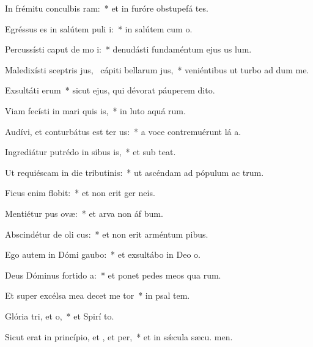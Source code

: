 \item In frémitu conculbis ram:~* et in furóre obstupefá tes.
\item Egréssus es in salútem puli i:~* in salútem cum  o.
\item Percussísti caput de mo i:~* denudásti fundaméntum ejus us  lum.
\item Maledixísti sceptris jus,~\pscross{} cápiti bellarum jus,~* veniéntibus ut turbo ad dum me.
\item Exsultáti erum~* sicut ejus, qui dévorat páuperem  dito.
\item Viam fecísti in mari quis is,~* in luto aquá rum.
\item Audívi, et conturbátus est ter us:~* a voce contremuérunt lá a.
\item Ingrediátur putrédo in sibus is,~* et sub  teat.
\item Ut requiéscam in die tributinis:~* ut ascéndam ad pópulum ac trum.
\item Ficus enim  flobit:~* et non erit ger  neis.
\item Mentiétur pus ovæ:~* et arva non áf bum.
\item Abscindétur de oli cus:~* et non erit arméntum  pibus.
\item Ego autem in Dómi gaubo:~* et exsultábo in Deo  o.
\item Deus Dóminus fortido a:~* et ponet pedes meos qua rum.
\item Et super excélsa mea decet me tor~* in psal tem.
\item Glória tri, et o,~* et Spirí to.
\item Sicut erat in princípio, et , et per,~* et in sǽcula sæcu. men.
